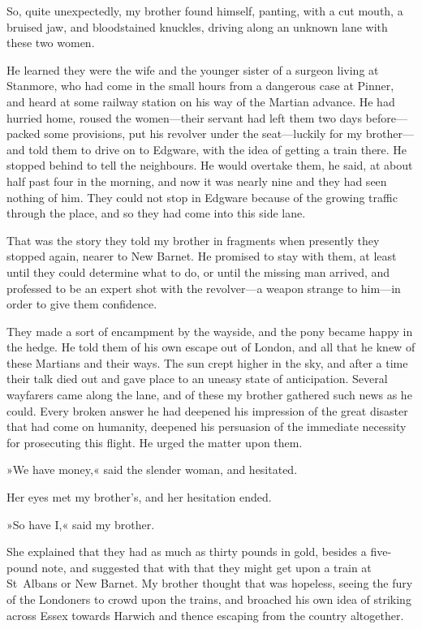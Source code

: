 So, quite unexpectedly, my brother found himself, panting, with a cut mouth, a bruised jaw, and bloodstained knuckles, driving along an unknown lane with these two women.

He learned they were the wife and the younger sister of a surgeon living at Stanmore, who had come in the small hours from a dangerous case at Pinner, and heard at some railway station on his way of the Martian advance. He had hurried home, roused the women—their servant had left them two days before—packed some provisions, put his revolver under the seat—luckily for my brother—and told them to drive on to Edgware, with the idea of getting a train there. He stopped behind to tell the neighbours. He would overtake them, he said, at about half past four in the morning, and now it was nearly nine and they had seen nothing of him. They could not stop in Edgware because of the growing traffic through the place, and so they had come into this side lane.

That was the story they told my brother in fragments when presently they stopped again, nearer to New Barnet. He promised to stay with them, at least until they could determine what to do, or until the missing man arrived, and professed to be an expert shot with the revolver—a weapon strange to him—in order to give them confidence.

They made a sort of encampment by the wayside, and the pony became happy in the hedge. He told them of his own escape out of London, and all that he knew of these Martians and their ways. The sun crept higher in the sky, and after a time their talk died out and gave place to an uneasy state of anticipation. Several wayfarers came along the lane, and of these my brother gathered such news as he could. Every broken answer he had deepened his impression of the great disaster that had come on humanity, deepened his persuasion of the immediate necessity for prosecuting this flight. He urged the matter upon them.

»We have money,« said the slender woman, and hesitated.

Her eyes met my brother's, and her hesitation ended.

»So have I,« said my brother.

She explained that they had as much as thirty pounds in gold, besides a five-pound note, and suggested that with that they might get upon a train at St~Albans or New Barnet. My brother thought that was hopeless, seeing the fury of the Londoners to crowd upon the trains, and broached his own idea of striking across Essex towards Harwich and thence escaping from the country altogether.

